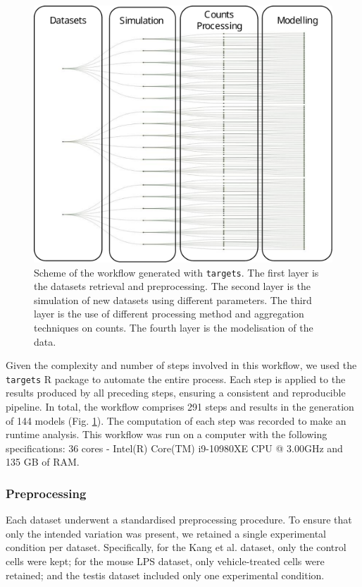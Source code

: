 \documentclass[a4paper, 11pt, twocolumn]{article}
\begin{document}
\begin{multicols}{2}
\begin{figure}[H]
	\centering
	\includegraphics[width=0.7\columnwidth]{img/workflowCut.pdf}
	\caption{{\footnotesize Scheme of the workflow generated with \texttt{targets}. The first layer is the datasets retrieval and preprocessing. The second layer is the simulation of new datasets using different parameters. The third layer is the use of different processing method and aggregation techniques on counts. The fourth layer is the modelisation of the data.}}
	\label{fig:workflow}
\end{figure}

Given the complexity and number of steps involved in this workflow, we used the \texttt{targets} R package \citep{targets} to automate the entire process. Each step is applied to the results produced by all preceding steps, ensuring a consistent and reproducible pipeline. In total, the workflow comprises 291 steps and results in the generation of 144 models (Fig. \ref{fig:workflow}). The computation of each step was recorded to make an runtime analysis. This workflow was run on a computer with the following specifications:  36 cores - Intel(R) Core(TM) i9-10980XE CPU @ 3.00GHz and 135 GB of RAM.

\subsubsection{Preprocessing}

Each dataset underwent a standardised preprocessing procedure. To ensure that only the intended variation was present, we retained a single experimental condition per dataset. Specifically, for the Kang et al. dataset, only the control cells were kept; for the mouse LPS dataset, only vehicle-treated cells were retained; and the testis dataset included only one experimental condition.


\end{multicols}
\end{document}
